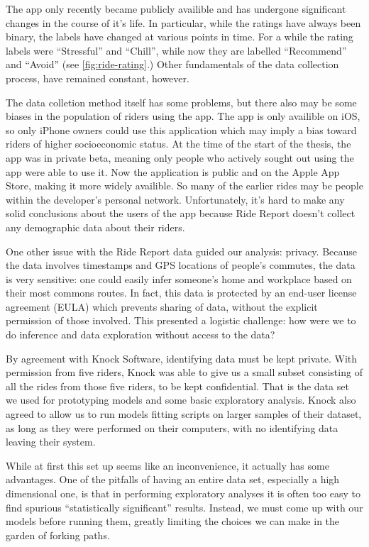 \documentclass[12pt,twoside]{reedthesis}
\begin{document}
  The app only recently became publicly availible and has undergone
  significant changes in the course of it's life. In particular, while the
  ratings have always been binary, the labels have changed at various
  points in time. For a while the rating labels were ``Stressful'' and
  ``Chill'', while now they are labelled ``Recommend'' and ``Avoid'' (see
  \autoref{fig:ride-rating}.) Other fundamentals of the data collection
  process, have remained constant, however.
  
  The data colletion method itself has some problems, but there also may
  be some biases in the population of riders using the app. The app is
  only availible on iOS, so only iPhone owners could use this application
  which may imply a bias toward riders of higher socioeconomic status. At
  the time of the start of the thesis, the app was in private beta,
  meaning only people who actively sought out using the app were able to
  use it. Now the application is public and on the Apple App Store, making
  it more widely availible. So many of the earlier rides may be people
  within the developer's personal network. Unfortunately, it's hard to
  make any solid conclusions about the users of the app because Ride
  Report doesn't collect any demographic data about their riders.
  
  One other issue with the Ride Report data guided our analysis: privacy.
  Because the data involves timestamps and GPS locations of people's
  commutes, the data is very sensitive: one could easily infer someone's
  home and workplace based on their most commons routes. In fact, this
  data is protected by an end-user license agreement (EULA) which prevents
  sharing of data, without the explicit permission of those involved. This
  presented a logistic challenge: how were we to do inference and data
  exploration without access to the data?
  
  By agreement with Knock Software, identifying data must be kept private.
  With permission from five riders, Knock was able to give us a small
  subset consisting of all the rides from those five riders, to be kept
  confidential. That is the data set we used for prototyping models and
  some basic exploratory analysis. Knock also agreed to allow us to run
  models fitting scripts on larger samples of their dataset, as long as
  they were performed on their computers, with no identifying data leaving
  their system.
  
  While at first this set up seems like an inconvenience, it actually has
  some advantages. One of the pitfalls of having an entire data set,
  especially a high dimensional one, is that in performing exploratory
  analyses it is often too easy to find spurious ``statistically
  significant'' results. Instead, we must come up with our models before
  running them, greatly limiting the choices we can make in the garden of
  forking paths.
  
\end{document}
